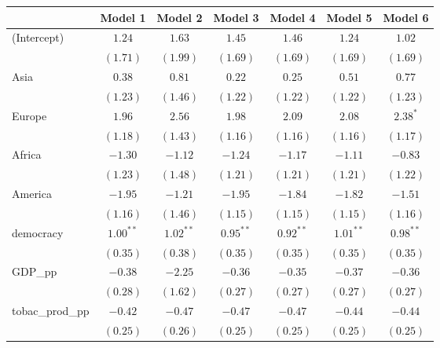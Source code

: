 
\begin{table}[!h]
\begin{center}
\begin{tabular}{l c c c c c c }
\toprule
 & Model 1 & Model 2 & Model 3 & Model 4 & Model 5 & Model 6 \\
\midrule
(Intercept)             & $1.24$      & $1.63$      & $1.45$      & $1.46$      & $1.24$      & $1.02$      \\
                        & $(1.71)$    & $(1.99)$    & $(1.69)$    & $(1.69)$    & $(1.69)$    & $(1.69)$    \\
Asia                    & $0.38$      & $0.81$      & $0.22$      & $0.25$      & $0.51$      & $0.77$      \\
                        & $(1.23)$    & $(1.46)$    & $(1.22)$    & $(1.22)$    & $(1.22)$    & $(1.23)$    \\
Europe                  & $1.96$      & $2.56$      & $1.98$      & $2.09$      & $2.08$      & $2.38^{*}$  \\
                        & $(1.18)$    & $(1.43)$    & $(1.16)$    & $(1.16)$    & $(1.16)$    & $(1.17)$    \\
Africa                  & $-1.30$     & $-1.12$     & $-1.24$     & $-1.17$     & $-1.11$     & $-0.83$     \\
                        & $(1.23)$    & $(1.48)$    & $(1.21)$    & $(1.21)$    & $(1.21)$    & $(1.22)$    \\
America                 & $-1.95$     & $-1.21$     & $-1.95$     & $-1.84$     & $-1.82$     & $-1.51$     \\
                        & $(1.16)$    & $(1.46)$    & $(1.15)$    & $(1.15)$    & $(1.15)$    & $(1.16)$    \\
democracy               & $1.00^{**}$ & $1.02^{**}$ & $0.95^{**}$ & $0.92^{**}$ & $1.01^{**}$ & $0.98^{**}$ \\
                        & $(0.35)$    & $(0.38)$    & $(0.35)$    & $(0.35)$    & $(0.35)$    & $(0.35)$    \\
GDP\_pp                 & $-0.38$     & $-2.25$     & $-0.36$     & $-0.35$     & $-0.37$     & $-0.36$     \\
                        & $(0.28)$    & $(1.62)$    & $(0.27)$    & $(0.27)$    & $(0.27)$    & $(0.27)$    \\
tobac\_prod\_pp         & $-0.42$     & $-0.47$     & $-0.47$     & $-0.47$     & $-0.44$     & $-0.44$     \\
                        & $(0.25)$    & $(0.26)$    & $(0.25)$    & $(0.25)$    & $(0.25)$    & $(0.25)$    \\

\end{tabular}
\end{center}
\end{table}
